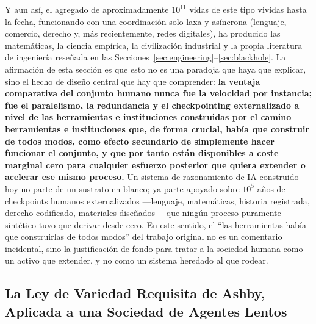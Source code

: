 \documentclass[11pt]{article}
\begin{document}
Y aun así, el agregado de aproximadamente $10^{11}$ vidas de este tipo vividas hasta la fecha, funcionando con una coordinación solo laxa y asíncrona (lenguaje, comercio, derecho y, más recientemente, redes digitales), ha producido las matemáticas, la ciencia empírica, la civilización industrial y la propia literatura de ingeniería reseñada en las Secciones~\ref{sec:engineering}--\ref{sec:blackhole}. La afirmación de esta sección es que esto no es una paradoja que haya que explicar, sino el hecho de diseño central que hay que comprender: \textbf{la ventaja comparativa del conjunto humano nunca fue la velocidad por instancia; fue el paralelismo, la redundancia y el checkpointing externalizado a nivel de las herramientas e instituciones construidas por el camino —herramientas e instituciones que, de forma crucial, había que construir de todos modos, como efecto secundario de simplemente hacer funcionar el conjunto, y que por tanto están disponibles a coste marginal cero para cualquier esfuerzo posterior que quiera extender o acelerar ese mismo proceso.} Un sistema de razonamiento de IA construido hoy no parte de un sustrato en blanco; ya parte apoyado sobre $10^5$ años de checkpoints humanos externalizados —lenguaje, matemáticas, historia registrada, derecho codificado, materiales diseñados— que ningún proceso puramente sintético tuvo que derivar desde cero. En este sentido, el ``las herramientas había que construirlas de todos modos'' del trabajo original no es un comentario incidental, sino la justificación de fondo para tratar a la sociedad humana como un activo que extender, y no como un sistema heredado al que rodear.

\subsection{La Ley de Variedad Requisita de Ashby, Aplicada a una Sociedad de Agentes Lentos}
\end{document}

